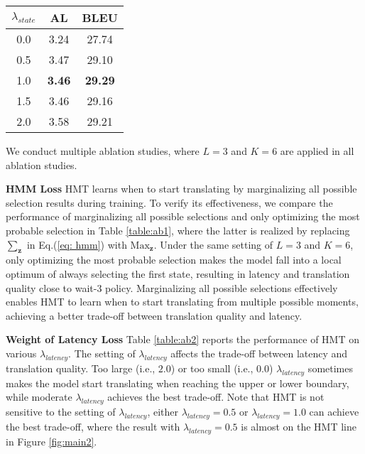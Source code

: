 \documentclass{article} %
\begin{document}
\begin{table}[t]
\begin{minipage}[t]{0.255\textwidth}
\label{table:ab3}
\vspace{-0.05in}
\begin{tabular}{c|cc} \hline
$\lambda_{state}$   & \textbf{AL}   & \textbf{BLEU}  \\ \hline
0.0 & 3.24          & 27.74          \\
0.5 & 3.47          & 29.10          \\
1.0 & \textbf{3.46} & \textbf{29.29} \\
1.5 & 3.46          & 29.16          \\
2.0 & 3.58          & 29.21         \\\hline
\end{tabular}
\end{minipage}
\end{table}

We conduct multiple ablation studies, where $L\!=\!3$ and $K\!=\!6$ are applied in all ablation studies.

\textbf{HMM Loss} HMT learns when to start translating by marginalizing all possible selection results during training. To verify its effectiveness, we compare the performance of marginalizing all possible selections and only optimizing the most probable selection in Table \ref{table:ab1}, where the latter is realized by replacing $\sum_{\mathbf{z}}$ in Eq.(\ref{eq: hmm}) with $\mathrm{Max}_{\mathbf{z}}$. Under the same setting of $L\!=3$ and $K\!=\!6$, only optimizing the most probable selection makes the model fall into a local optimum \citep{miao-etal-2021-generative} of always selecting the first state, resulting in latency and translation quality close to wait-3 policy. Marginalizing all possible selections effectively enables HMT to learn when to start translating from multiple possible moments, achieving a better trade-off between translation quality and latency.

\textbf{Weight of Latency Loss} Table \ref{table:ab2} reports the performance of HMT on various $\lambda_{latency}$. The setting of $\lambda_{latency}$ affects the trade-off between latency and translation quality. Too large (i.e., $2.0$) or too small (i.e., $0.0$) $\lambda_{latency}$ sometimes makes the model start translating when reaching the upper or lower boundary, while moderate $\lambda_{latency}$ achieves the best trade-off. Note that HMT is not sensitive to the setting of $\lambda_{latency}$, either $\lambda_{latency}\!=\!0.5$ or $\lambda_{latency}\!=\!1.0$ can achieve the best trade-off, where the result with $\lambda_{latency}\!=\!0.5$ is almost on the HMT line in Figure \ref{fig:main2}.
\end{document}
